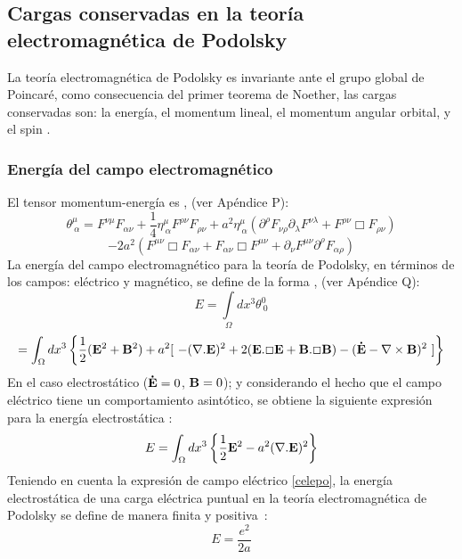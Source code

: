 \documentclass[a4paper,12pt]{article}
\begin{document}
\subsection{Cargas conservadas en la teoría electromagnética de Podolsky}
La teoría electromagnética de Podolsky es invariante ante el grupo global de Poincaré, como consecuencia del primer teorema de Noether, las cargas conservadas son: la energía, el momentum lineal, el momentum angular orbital, y el spin \cite{noether,greiner,podolsky}.  
\subsubsection{Energía del campo electromagnético}
El tensor momentum-energía es \cite{podolsky}, (ver Apéndice P):
\begin{equation}
\theta^\mu_{\ \alpha}=F^{\nu\mu}F_{\alpha\nu}+\frac{1}{4}\eta^\mu_{\ \alpha}F^{\rho\nu}F_{\rho\nu}+a^2\eta^\mu_{\ \alpha}(\partial^\rho F_{\nu\rho}\partial_\lambda F^{\nu\lambda}+F^{\rho\nu}\Box F_{\rho\nu})
\end{equation}
$$-2a^2(F^{\mu\nu}\Box F_{\alpha\nu}+F_{\alpha\nu}\Box F^{\mu\nu}+\partial_\nu F^{\mu\nu}\partial^\rho F_{\alpha\rho}) $$
La energía del campo electromagnético para la teoría de Podolsky, en términos de los campos: eléctrico y magnético, se define de la forma \cite{podolsky}, (ver Apéndice Q):
\begin{equation}
E=\int\limits_{\Omega}dx^{3}\theta^{0}_{\ 0}
\label{energy} 
\end{equation}
$$
=\int_\Omega dx^3\left\{\frac{1}{2}({\bf E}^2+{\bf B}^2)+a^2[\  -({\nabla.\bf E})^2+2({\bf E}.\Box {\bf E}+{\bf B}.\Box {\bf B})-({\bf \dot E}-\nabla \times{\bf B})^2\ ]\right\} 
$$
En el caso electrostático (${\bf \dot E }=0$, ${\bf  B }=0$); y considerando el hecho que el campo eléctrico tiene un comportamiento asintótico, se obtiene la siguiente expresión para la energía electrostática \cite{podolsky}:
\begin{equation}
E=\int_\Omega dx^3\left\{\frac{1}{2}{\bf E}^2-a^2 ({\nabla.\bf E})^2\right\} 
\end{equation}
Teniendo en cuenta la expresión de campo eléctrico \eqref{celepo}, la energía electrostática de una carga eléctrica puntual en la teoría electromagnética de Podolsky se define de manera finita y \mbox{positiva \cite{podolfuerza}:}
\begin{equation}
E=\frac{e^2}{2a} 
\label{enfipo}
\end{equation}
\end{document}
